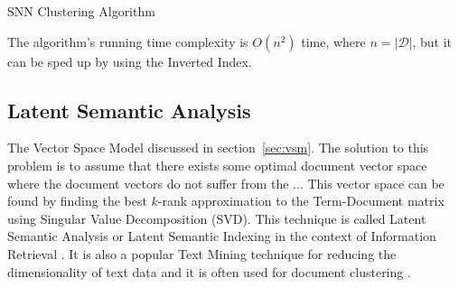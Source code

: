 \begin{algorithm} \caption{SNN Clustering Algorithm} \label{algo:snn-clustering}

\begin{algorithmic}[0]
  \Statex
     
    \EndFor

     
    \EndFor

    \State {}
  \EndFunction
\end{algorithmic}

\end{algorithm}

The algorithm's running time complexity is $O(n^2)$ time, where $n = |\mathcal D|$,
but it can be sped up by using the Inverted Index.






\subsection{Latent Semantic Analysis} \label{sec:lsa}

The Vector Space Model discussed in section~\ref{sec:vsm}.
The solution to this problem is to assume that there exists
some optimal document vector space where the document vectors
do not suffer from the ...
This vector space can be found by finding the best $k$-rank approximation
to the Term-Document matrix using Singular Value Decomposition (SVD).
This technique is called Latent Semantic Analysis \cite{landauer1998introduction}
or Latent Semantic Indexing in the context of Information Retrieval
\cite{deerwester1990indexing}.
It is also a popular Text Mining technique for reducing the dimensionality
of text data and it is often used for
document clustering \cite{aggarwal2012survey} \cite{osinski2004lingo}.


